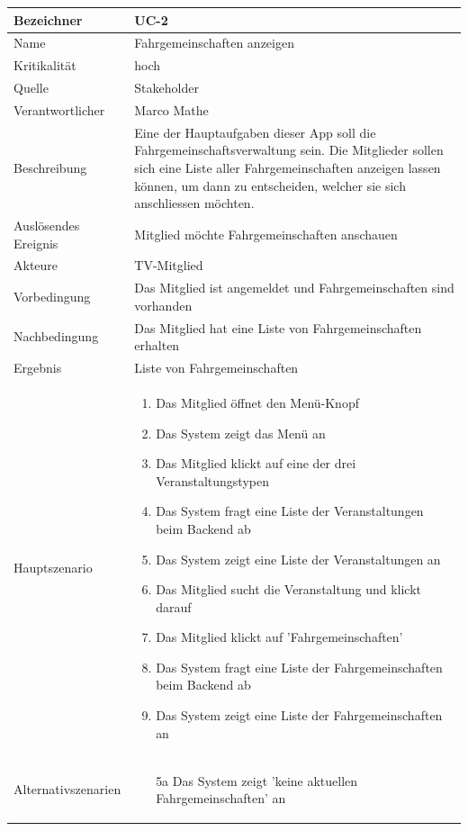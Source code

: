 \begin{table}[ht]
\centering
  \begin{tabular}{ l | p{10cm} }
	\hline
	\rowcolor{gray}
	Bezeichner		&	UC-2\\ \hline
	Name			&	Fahrgemeinschaften anzeigen\\ \hline
	Kritikalität		&	hoch\\ \hline
	Quelle			&	Stakeholder\\ \hline
	Verantwortlicher	&	Marco Mathe\\ \hline
	Beschreibung	&	Eine der Hauptaufgaben dieser App soll die Fahrgemeinschaftsverwaltung sein. Die Mitglieder sollen sich eine Liste aller Fahrgemeinschaften anzeigen lassen können, um dann zu entscheiden, welcher sie sich anschliessen möchten.\\ \hline
	Auslösendes Ereignis&	Mitglied möchte Fahrgemeinschaften anschauen\\ \hline
	Akteure		&	TV-Mitglied\\ \hline
	Vorbedingung	&	Das Mitglied ist angemeldet und Fahrgemeinschaften sind vorhanden\\ \hline
	Nachbedingung	&	Das Mitglied hat eine Liste von Fahrgemeinschaften erhalten\\ \hline
	Ergebnis		&	Liste von Fahrgemeinschaften\\ \hline
	Hauptszenario	&	\begin{enumerate}
					\item Das Mitglied öffnet den Menü-Knopf
					\item Das System zeigt das Menü an
					\item Das Mitglied klickt auf eine der drei Veranstaltungstypen
					\item Das System fragt eine Liste der Veranstaltungen beim Backend ab
					\item Das System zeigt eine Liste der Veranstaltungen an
					\item Das Mitglied sucht die Veranstaltung und klickt darauf
					\item Das Mitglied klickt auf 'Fahrgemeinschaften'
					\item Das System fragt eine Liste der Fahrgemeinschaften beim Backend ab
					\item Das System zeigt eine Liste der Fahrgemeinschaften an
					\end{enumerate}
					\\ \hline
	Alternativszenarien	&	\begin{enumerate}
					\item[5a] Das System zeigt 'keine aktuellen Fahrgemeinschaften' an

\end{enumerate}
\end{tabular}
\end{table}
